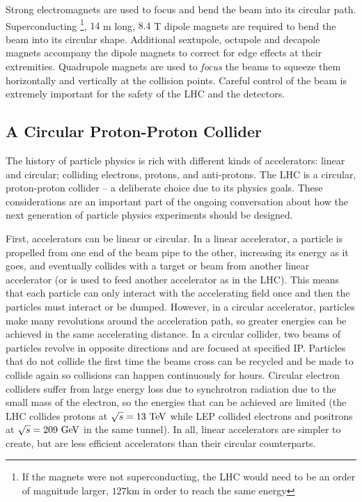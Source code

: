 Strong electromagnets are used to focus and bend the beam into its circular path. Superconducting \footnote{If the magnets were not superconducting, the \ac{LHC} would need to be an order of magnitude larger, $127 \textrm{km}$ in order to reach the same energy}, $14$ m long, $8.4$ T dipole magnets are required to bend the beam into its circular shape. Additional sextupole, octupole and decapole magnets accompany the dipole magnets to  correct for edge effects at their extremities. Quadrupole magnets are used to \emph{focus} the beams to squeeze them horizontally and vertically at the collision points. Careful control of the beam is extremely important for the safety of the \ac{LHC} and the detectors. 


\subsection{A Circular Proton-Proton Collider}

The history of particle physics is rich with different kinds of accelerators: linear and circular; colliding electrons, protons, and anti-protons. The \ac{LHC} is a circular, proton-proton collider -- a deliberate choice due to its physics goals. These considerations are an important part of the ongoing conversation about how the next generation of particle physics experiments should be designed. 

First, accelerators can be linear or circular. In a linear accelerator, a particle is propelled from one end of the beam pipe to the other, increasing its energy as it goes, and eventually collides with a target or beam from another linear accelerator (or is used to feed another accelerator as in the \ac{LHC}). This means that each particle can only interact with the accelerating field once and then the particles must interact or be dumped. However, in a circular accelerator, particles make many revolutions around the acceleration path, so greater energies can be achieved in the same accelerating distance. In a circular collider, two beams of particles revolve in opposite directions and are focused at specified \ac{IP}. Particles that do not collide the first time the beams cross can be recycled and be made to collide again so collisions can happen continuously for hours. Circular electron colliders suffer from large energy loss due to synchrotron radiation due to the small mass of the electron, so the energies that can be achieved are limited (the \ac{LHC} collides protons at $\sqrt{s} = 13 \TeV$ while \ac{LEP} collided electrons and positrons at $\sqrt{s} = 209 \GeV$ in the same tunnel). In all, linear accelerators are simpler to create, but are less efficient accelerators than their circular counterparts. 

